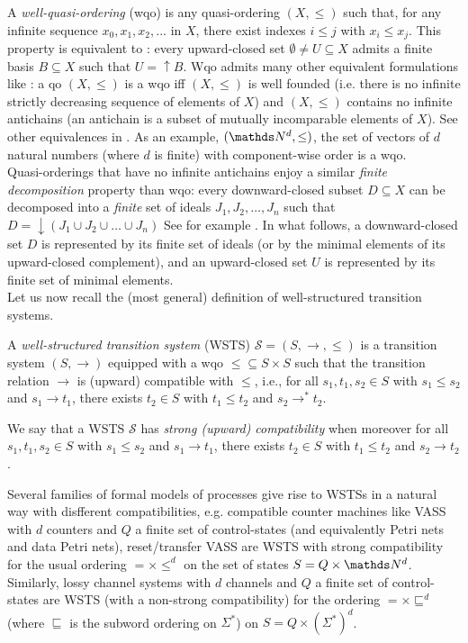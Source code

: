 \documentclass[runningheads]{llncs}
\begin{document}
 A {\em well-quasi-ordering} (wqo) is any quasi-ordering $(X,\leq)$ such that, for any infinite sequence $x_0, x_1, x_2, ...$ in $X$, there exist indexes $i \leq j$ with $x_i \leq  x_j$. This property is equivalent to : every upward-closed set $\emptyset \neq U \subseteq X$ admits a finite basis $B \subseteq X$ such that $U=\uparrow B$.
%
%
%
Wqo admits many other equivalent formulations like : a qo $(X,\leq)$ is a wqo iff $(X,\leq)$ is well founded (i.e. there is no infinite strictly decreasing sequence
of elements of $X$) and $(X,\leq)$ contains no infinite antichains (an antichain is a subset of mutually incomparable elements of $X$). See other equivalences in \cite{schmitz:cel-00727025}. 
%
%
As an example, $(\N^d, \leq)$, the set of vectors of $d$ natural numbers (where $d$ is finite) with component-wise order is a wqo.\\
Quasi-orderings that have no 
infinite antichains
 enjoy a similar \emph{finite decomposition} property than wqo: every downward-closed subset $D \subseteq X$ can be decomposed into a \emph{finite} set of ideals $J_1, J_2, \ldots, J_n$ such that $D = \downarrow (J_1 \cup J_2 \cup \ldots \cup J_n)$ See for example \cite{BFM-ic17}.
%
%
In what follows, a downward-closed set $D$ is represented by its finite set of ideals (or by the minimal elements of its upward-closed complement), and an upward-closed set $U$ is represented by its finite set of minimal elements. \\

\noindent
Let us now recall the (most general) definition of well-structured transition systems.
\begin{definition}\cite{DBLP:journals/iandc/Finkel90,DBLP:journals/tcs/FinkelS01}
A {\em well-structured transition system} (WSTS)  $\mathscr{S}=(S, \rightarrow, \leq)$
is a transition system $(S, \rightarrow)$
equipped with a wqo ${\leq} \subseteq S \times S$ such that   
the transition relation $ \rightarrow$ is (upward) compatible with $\leq$, i.e., for all 
$s_1, t_1 , s_2 \in S$
	with $s_1 \leq s_2$  and $s_1 \rightarrow t_1$, there exists 
	$t_2 \in S$ with 
	$t_1 \leq t_2$ and $s_2 \rightarrow^{*} t_2$.
\end{definition}

We say that a WSTS $\mathscr{S}$ has \emph{strong (upward) compatibility} when moreover for all 
$s_1, t_1 , s_2 \in S$
	with $s_1 \leq s_2$  and $s_1 \rightarrow t_1$, there exists 
	$t_2 \in S$ with 
	$t_1 \leq t_2$ and $s_2 \rightarrow t_2$.

Several families of formal models of processes give rise to WSTSs in a natural way with disfferent compatibilities, e.g. compatible counter machines like VASS with $d$ counters and $Q$ a finite set of control-states (and equivalently Petri nets and data Petri nets), reset/transfer VASS are WSTS with strong compatibility for the usual ordering $=\times \leq^d$ on the set of states $S=Q \times \N^d$.
Similarly, lossy channel systems with $d$ channels and $Q$ a finite set of control-states are WSTS (with a non-strong compatibility)
for the ordering $=\times \sqsubseteq^d$ (where $\sqsubseteq$ is the subword ordering on $\Sigma^*$) on $S= Q \times (\Sigma^*)^d$.\\
\end{document}
